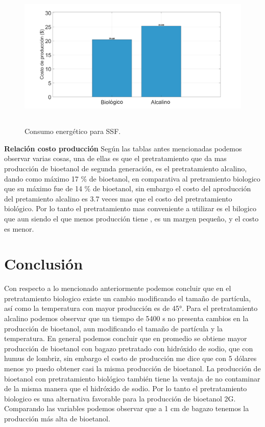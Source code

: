 \documentclass[12pt]{article}
\begin{document}
\begin{figure} [H]
	\centering
	\includegraphics[width=16cm, height=7cm]{imagenes/costos}
	\caption{Consumo energético para SSF. }
	\label{grafica}
\end{figure}
\textbf{Relación costo producción}
\newline
Según las tablas antes mencionadas podemos observar varias cosas, una de ellas es que el pretratamiento que da mas producción de bioetanol de segunda generación, es el  pretratamiento alcalino, dando como máximo 17 \% de bioetanol, en comparativa al pretramiento biologico que su máximo fue de 14 \% de bioetanol, sin embargo el costo del aproducción del pretamiento alcalino es 3.7 veces mas que el costo del pretratamiento biológico.
Por lo tanto el pretratamiento mas conveniente a utilizar es el bilogico que aun siendo el que menos producción tiene , es un margen pequeño, y el costo es menor.





\newpage
		\section{Conclusión}
		Con respecto a lo mencionado anteriormente podemos concluir que en el pretratamiento biologico existe un cambio modificando el tamaño de partícula, así como la temperatura con mayor producción es de 45°.
		Para el pretratamiento alcalino podemos observar que un tiempo de  5400 s no presenta cambios en la producción de bioetanol, aun modificando el tamaño de partícula y la temperatura. En general podemos concluir que en promedio se obtiene mayor producción de bioetanol con bagazo pretratado con hidróxido de sodio, que con humus de lombriz, sin embargo el costo de producción me dice que con 5 dólares menos yo puedo obtener casi la misma producción de bioetanol. La producción de bioetanol con pretratamiento biológico también tiene la ventaja de no contaminar de la misma manera que el hidróxido de sodio.
		Por lo tanto el pretratamiento biologico es una alternativa favorable para la producción de bioetanol 2G. Comparando las variables podemos observar que a 1 cm de bagazo tenemos la producción más alta de bioetanol.
		
\end{document}
